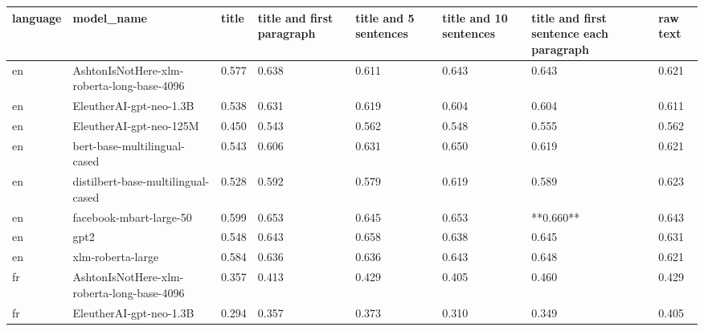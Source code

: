 \begin{tabular}{llllllll}
\toprule
language &                                 model\_name & title & title and first paragraph & title and 5 sentences & title and 10 sentences & title and first sentence each paragraph &  raw text \\
\midrule
      en & AshtonIsNotHere-xlm-roberta-long-base-4096 & 0.577 &                     0.638 &                 0.611 &                  0.643 &                                   0.643 &     0.621 \\
      en &                    EleutherAI-gpt-neo-1.3B & 0.538 &                     0.631 &                 0.619 &                  0.604 &                                   0.604 &     0.611 \\
      en &                    EleutherAI-gpt-neo-125M & 0.450 &                     0.543 &                 0.562 &                  0.548 &                                   0.555 &     0.562 \\
      en &               bert-base-multilingual-cased & 0.543 &                     0.606 &                 0.631 &                  0.650 &                                   0.619 &     0.621 \\
      en &         distilbert-base-multilingual-cased & 0.528 &                     0.592 &                 0.579 &                  0.619 &                                   0.589 &     0.623 \\
      en &                    facebook-mbart-large-50 & 0.599 &                     0.653 &                 0.645 &                  0.653 &                               **0.660** &     0.643 \\
      en &                                       gpt2 & 0.548 &                     0.643 &                 0.658 &                  0.638 &                                   0.645 &     0.631 \\
      en &                          xlm-roberta-large & 0.584 &                     0.636 &                 0.636 &                  0.643 &                                   0.648 &     0.621 \\
      fr & AshtonIsNotHere-xlm-roberta-long-base-4096 & 0.357 &                     0.413 &                 0.429 &                  0.405 &                                   0.460 &     0.429 \\
      fr &                    EleutherAI-gpt-neo-1.3B & 0.294 &                     0.357 &                 0.373 &                  0.310 &                                   0.349 &     0.405 \\

\end{tabular}
